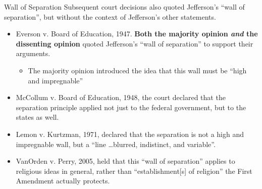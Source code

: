 \begin{frame}{Wall of Separation}
    Subsequent court decisions also quoted Jefferson's ``wall of separation'', but without the context of Jefferson's other statements.
    \begin{itemize}
        \item Everson v. Board of Education, 1947. \textbf{Both the majority opinion \textit{and} the dissenting opinion} quoted Jefferson's ``wall of separation'' to support their arguments.
            \begin{itemize}
                \item The majority opinion introduced the idea that this wall must be ``high and impregnable''
            \end{itemize}
        \item McCollum v. Board of Education, 1948, the court declared that the separation principle applied not just to the federal government, but to the states as well.
        \item Lemon v. Kurtzman, 1971, declared that the separation is not a high and impregnable wall, but a ``line \ldots blurred, indistinct, and variable''.
        \item VanOrden v. Perry, 2005, held that this ``wall of separation'' applies to religious ideas in general, rather than ``establishment[s] of religion'' the First Amendment actually protects.
    \end{itemize}
\end{frame}


